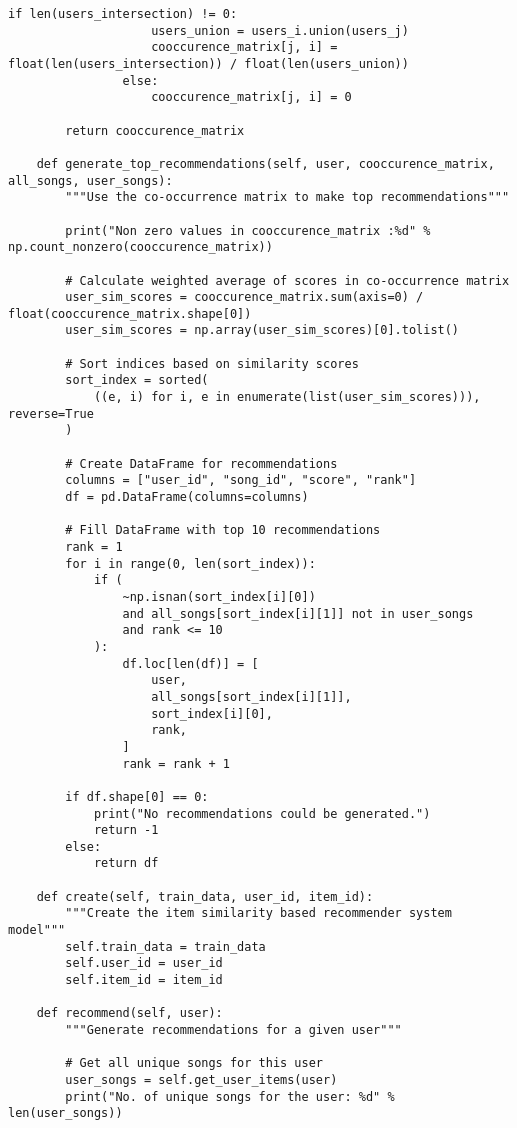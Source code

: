 \documentclass[12pt,a4paper]{article}
\begin{document}
\begin{lstlisting}[caption=Complete Item-Based Collaborative Filtering Implementation]
                if len(users_intersection) != 0:
                    users_union = users_i.union(users_j)
                    cooccurence_matrix[j, i] = float(len(users_intersection)) / float(len(users_union))
                else:
                    cooccurence_matrix[j, i] = 0

        return cooccurence_matrix

    def generate_top_recommendations(self, user, cooccurence_matrix, all_songs, user_songs):
        """Use the co-occurrence matrix to make top recommendations"""
        
        print("Non zero values in cooccurence_matrix :%d" % np.count_nonzero(cooccurence_matrix))

        # Calculate weighted average of scores in co-occurrence matrix
        user_sim_scores = cooccurence_matrix.sum(axis=0) / float(cooccurence_matrix.shape[0])
        user_sim_scores = np.array(user_sim_scores)[0].tolist()

        # Sort indices based on similarity scores
        sort_index = sorted(
            ((e, i) for i, e in enumerate(list(user_sim_scores))), reverse=True
        )

        # Create DataFrame for recommendations
        columns = ["user_id", "song_id", "score", "rank"]
        df = pd.DataFrame(columns=columns)

        # Fill DataFrame with top 10 recommendations
        rank = 1
        for i in range(0, len(sort_index)):
            if (
                ~np.isnan(sort_index[i][0])
                and all_songs[sort_index[i][1]] not in user_songs
                and rank <= 10
            ):
                df.loc[len(df)] = [
                    user,
                    all_songs[sort_index[i][1]],
                    sort_index[i][0],
                    rank,
                ]
                rank = rank + 1

        if df.shape[0] == 0:
            print("No recommendations could be generated.")
            return -1
        else:
            return df

    def create(self, train_data, user_id, item_id):
        """Create the item similarity based recommender system model"""
        self.train_data = train_data
        self.user_id = user_id
        self.item_id = item_id

    def recommend(self, user):
        """Generate recommendations for a given user"""
        
        # Get all unique songs for this user
        user_songs = self.get_user_items(user)
        print("No. of unique songs for the user: %d" % len(user_songs))


\end{lstlisting}
\end{document}

